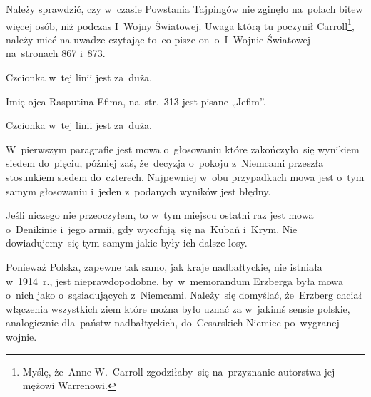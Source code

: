 \documentclass[a4paper,11pt]{article}
\begin{document}
\noindent
{} Należy sprawdzić, czy w~czasie Powstania Tajpingów nie zginęło
na~polach bitew więcej osób, niż podczas I~Wojny Światowej. Uwaga którą tu
poczynił Carroll\footnote{Myślę, że~Anne W.~Carroll zgodziłaby~się
  na~przyznanie autorstwa jej mężowi Warrenowi.}, należy mieć na uwadze
czytając to~co pisze on~o~I~Wojnie Światowej na~stronach 867 i~873.

\vspace{\spaceFour}





\noindent
{} Czcionka w~tej linii jest za~duża.

\vspace{\spaceFour}





\noindent
{} Imię ojca Rasputina Efima, na~str.~313 jest pisane „Jefim”.

\vspace{\spaceFour}





\noindent
{} Czcionka w~tej linii jest za~duża.

\vspace{\spaceFour}





\noindent
{} W~pierwszym paragrafie jest mowa o~głosowaniu które
zakończyło~się wynikiem siedem do~pięciu, później zaś, że~decyzja
o~pokoju z~Niemcami przeszła stosunkiem siedem do~czterech. Najpewniej
w~obu przypadkach mowa jest o~tym samym głosowaniu i~jeden z~podanych
wyników jest błędny.

\vspace{\spaceFour}





\noindent
{} Jeśli niczego nie przeoczyłem, to w~tym miejscu ostatni raz jest
mowa o~Denikinie i~jego armii, gdy wycofują~się na~Kubań i~Krym. Nie
dowiadujemy~się tym samym jakie były ich dalsze losy.

\vspace{\spaceFour}





\noindent
{} Ponieważ Polska, zapewne tak samo, jak kraje nadbałtyckie, nie
istniała w~1914~r., jest nieprawdopodobne, by~w~memorandum Erzberga była
mowa o~nich jako o~sąsiadujących z~Niemcami. Należy~się domyślać,
że~Erzberg chciał włączenia wszystkich ziem które można było uznać za
w~jakimś sensie polskie, analogicznie dla~państw nadbałtyckich,
do~Cesarskich Niemiec po~wygranej wojnie.
\end{document}
